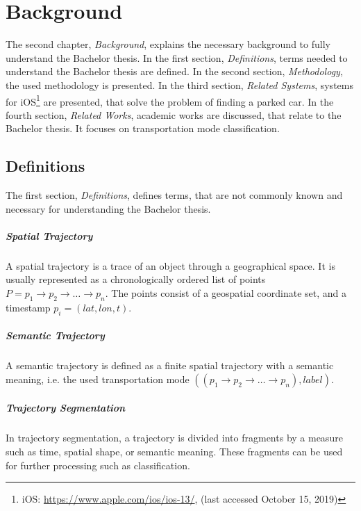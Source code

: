 \chapter{Background}
The second chapter, \textit{Background}, explains the necessary background to fully understand the Bachelor thesis. 
In the first section, \textit{Definitions}, terms needed to understand the Bachelor thesis are defined.
In the second section, \textit{Methodology}, the used methodology is presented.
In the third section, \textit{Related Systems}, systems for iOS\footnote{iOS: \url{https://www.apple.com/ios/ios-13/}, (last accessed October 15, 2019)} are presented, that solve the problem of finding a parked car.
In the fourth section, \textit{Related Works}, academic works are discussed, that relate to the Bachelor thesis. It focuses on transportation mode classification.

\section{Definitions}

The first section, \textit{Definitions}, defines terms, that are not commonly known and necessary for understanding the Bachelor thesis. 

\paragraph{Spatial Trajectory} A spatial trajectory is a trace of an object through a geographical space. It is usually represented as a chronologically ordered list of points $ P = p_1\rightarrow p_2 \rightarrow \dots \rightarrow p_n$. The points consist of a geospatial coordinate set, and a timestamp $p_i=(lat,lon,t)$. \cite{Zheng:2015:TDM:2764959.2743025}

\paragraph{Semantic Trajectory} A semantic trajectory is defined as a finite spatial trajectory with a semantic meaning, i.e. the used transportation mode $((p_1\rightarrow p_2 \rightarrow \dots \rightarrow p_n), label)$. \cite{Zheng:2015:TDM:2764959.2743025}

\paragraph{Trajectory Segmentation} In trajectory segmentation, a trajectory is divided into fragments by a measure such as time, spatial shape, or semantic meaning. These fragments can be used for further processing such as classification. \cite{Zheng:2015:TDM:2764959.2743025}

